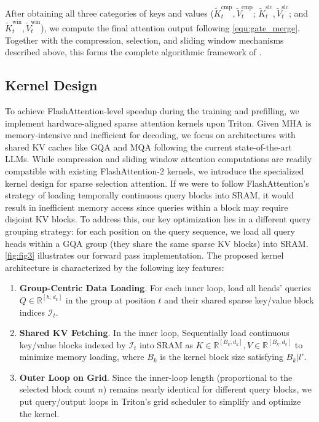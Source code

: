 After obtaining all three categories of keys and values ($\tilde{K}_t^\text{cmp}, \tilde{V}_t^\text{cmp}$; $\tilde{K}_t^\text{slc}, \tilde{V}_t^\text{slc}$; and $\tilde{K}_t^\text{win}, \tilde{V}_t^\text{win}$), we compute the final attention output following \cref{equ:gate_merge}.
Together with the compression, selection, and sliding window mechanisms described above, this forms the complete algorithmic framework of \method{}.

\subsection{Kernel Design}
To achieve FlashAttention-level speedup during the training and prefilling, we implement hardware-aligned sparse attention kernels upon Triton. Given MHA is memory-intensive and inefficient for decoding, we focus on architectures with shared KV caches like GQA and MQA following the current state-of-the-art LLMs. While compression and sliding window attention computations are readily compatible with existing FlashAttention-2 kernels, we introduce the specialized kernel design for sparse selection attention.
If we were to follow FlashAttention's strategy of loading temporally continuous query blocks into SRAM, it would result in inefficient memory access since queries within a block may require disjoint KV blocks. To address this, our key optimization lies in a different query grouping strategy: for each position on the query sequence, we load all query heads within a GQA group (they share the same sparse KV blocks) into SRAM. \cref{fig:fig3} illustrates our forward pass implementation.
The proposed kernel architecture is characterized by the following key features:
\begin{enumerate}
    \item \textbf{Group-Centric Data Loading}. For each inner loop, load all heads' queries $Q\in \mathbb{R}^{[ h, d_k]}$ in the group at position $t$ and their shared sparse key/value block indices $\mathcal{I}_t$.
    \item \textbf{Shared KV Fetching}. In the inner loop, Sequentially load continuous key/value blocks indexed by $\mathcal{I}_t$ into SRAM as $K\in\mathbb{R}^{[B_k, d_k]}, V\in\mathbb{R}^{[B_k, d_v]}$ to minimize memory loading, where $B_k$ is the kernel block size satisfying $B_k | l'$.
    \item \textbf{Outer Loop on Grid}. Since the inner-loop length (proportional to the selected block count $n$) remains nearly identical for different query blocks, we put query/output loops in Triton's grid scheduler to simplify and optimize the kernel.
\end{enumerate}


